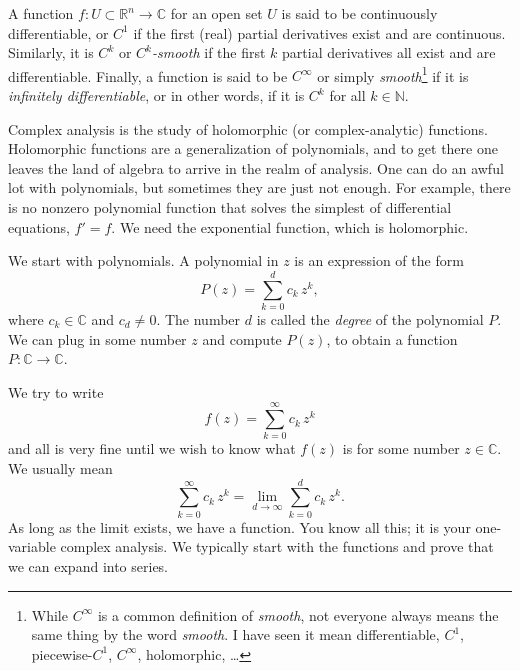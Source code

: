 \documentclass[12pt,openany]{book}
\newcommand{\C}{{\mathbb{C}}}
\newcommand{\R}{{\mathbb{R}}}
\newcommand{\N}{{\mathbb{N}}}
\newcommand{\myindex}[1]{#1\index{#1}}
\theoremstyle{plain}
\theoremstyle{remark}
\theoremstyle{definition}
\theoremstyle{exercise}
\theoremstyle{example}
\begin{document}
A function $f \colon U \subset \R^n \to \C$ for an open set $U$
is said to be continuously differentiable, or $C^1$ if the first (real)
partial derivatives exist and are continuous.
%
Similarly, it is $C^k$ or \emph{$C^k$-smooth}
if the first $k$ partial derivatives all exist and are differentiable.
%
Finally, a function is said to be $C^\infty$ or simply
\emph{smooth}\footnote{%
While $C^\infty$ is a common definition of \emph{smooth}, not everyone
always means
the same thing by the word \emph{smooth}.  I have seen it mean
differentiable, $C^1$, piecewise-$C^1$, $C^\infty$, holomorphic, \ldots}
if it is \emph{\myindex{infinitely differentiable}},
or in other words, if it is $C^k$ for all $k \in \N$.

\medskip

Complex analysis is the study of holomorphic (or complex-analytic)
functions.
Holomorphic functions are a generalization of polynomials,
and to get there one leaves the land of algebra to arrive in the realm of
analysis.
One can do an awful lot with polynomials, but sometimes they are
just not enough.  For example, there is no nonzero polynomial function that solves
the simplest of differential equations, $f' = f$.  We need the exponential
function, which is holomorphic.

We start with polynomials.  A polynomial in $z$ is
an expression of the form
\begin{equation*}
P(z) = \sum_{k=0}^d c_k \, z^k ,
\end{equation*}
where $c_k \in \C$ and $c_d \not= 0$.  The number $d$ is called the
\emph{degree}
of the
polynomial $P$.  We can plug in some number $z$ and compute
$P(z)$, to obtain a function $P \colon \C \to \C$.

We try to write
\begin{equation*}
f(z) = \sum_{k=0}^\infty c_k \, z^k
\end{equation*}
and all is very fine until we wish to know what $f(z)$ is for some number
$z \in \C$.
We usually mean
\begin{equation*}
\sum_{k=0}^\infty c_k \, z^k
=
\lim_{d\to\infty}
\sum_{k=0}^d c_k \, z^k .
\end{equation*}
As long as the limit exists, we have a function.  You know all
this; it is your one-variable complex analysis.  We typically
start with the functions and prove that we can expand into series.
\end{document}
